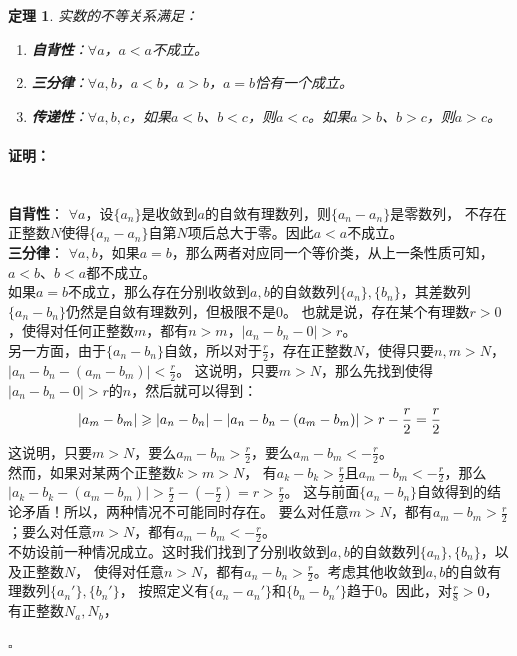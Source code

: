 \documentclass[12pt,UTF8]{ctexbook}
\newtheorem{tm}{定理}[section]
\renewenvironment{proof}{\paragraph{\textbf{证明：}}}{\hfill$\square$}
\begin{document}
\begin{appendix}
\begin{tm}\label{tm:a-1-15}
    实数的不等关系满足：
    \begin{enumerate}
        \item \textbf{自背性}：$\forall a$，$a < a$不成立。
        \item \textbf{三分律}：$\forall a, b$，$a < b$，$a > b$，$a = b$恰有一个成立。
        \item \textbf{传递性}：$\forall a, b, c$，如果$a < b$、$b < c$，则$a < c$。如果$a > b$、$b > c$，则$a > c$。
    \end{enumerate}
\end{tm}
\begin{proof}
    \mbox{} \\
    \textbf{自背性}： $\forall a$，设$\{a_n\}$是收敛到$a$的自敛有理数列，则$\{a_n - a_n\}$是零数列，
    不存在正整数$N$使得$\{a_n - a_n\}$自第$N$项后总大于零。因此$a<a$不成立。\\
    \textbf{三分律}： $\forall a, b$，如果$a = b$，那么两者对应同一个等价类，从上一条性质可知，$a<b$、$b<a$都不成立。\\
    如果$a = b$不成立，那么存在分别收敛到$a,b$的自敛数列$\{a_n\}, \{b_n\}$，其差数列$\{a_n - b_n\}$仍然是自敛有理数列，但极限不是$0$。
    也就是说，存在某个有理数$r>0$，使得对任何正整数$m$，都有$n>m$，$|a_n - b_n - 0| > r$。\\
    另一方面，由于$\{a_n - b_n\}$自敛，所以对于$\frac{r}{2}$，存在正整数$N$，使得只要$n,m>N$，$|a_n - b_n - (a_m - b_m)| < \frac{r}{2}$。
    这说明，只要$m>N$，那么先找到使得$|a_n - b_n - 0| > r$的$n$，然后就可以得到：
    \begin{align}
        |a_m - b_m| \geqslant |a_n - b_n| - |a_n - b_n - (a_m - b_m)| > r - \frac{r}{2} = \frac{r}{2} \notag 
    \end{align}
    这说明，只要$m>N$，要么$a_m - b_m > \frac{r}{2}$，要么$a_m - b_m < -\frac{r}{2}$。\\
    然而，如果对某两个正整数$k>m>N$，
    有$a_k - b_k > \frac{r}{2}$且$a_m - b_m < -\frac{r}{2}$，那么$|a_k - b_k - (a_m - b_m)| > \frac{r}{2} - (-\frac{r}{2}) = r > \frac{r}{2}$。
    这与前面$\{a_n - b_n\}$自敛得到的结论矛盾！所以，两种情况不可能同时存在。
    要么对任意$m>N$，都有$a_m - b_m > \frac{r}{2}$；要么对任意$m>N$，都有$a_m - b_m < -\frac{r}{2}$。\\
    不妨设前一种情况成立。这时我们找到了分别收敛到$a,b$的自敛数列$\{a_n\}, \{b_n\}$，以及正整数$N$，
    使得对任意$n>N$，都有$a_n - b_n > \frac{r}{2}$。考虑其他收敛到$a,b$的自敛有理数列$\{a_n'\}, \{b_n'\}$，
    按照定义有$\{a_n - a_n'\}$和$\{b_n - b_n'\}$趋于$0$。因此，对$\frac{r}{8}>0$，有正整数$N_a,N_b$，

\end{proof}
\end{appendix}
\end{document}
